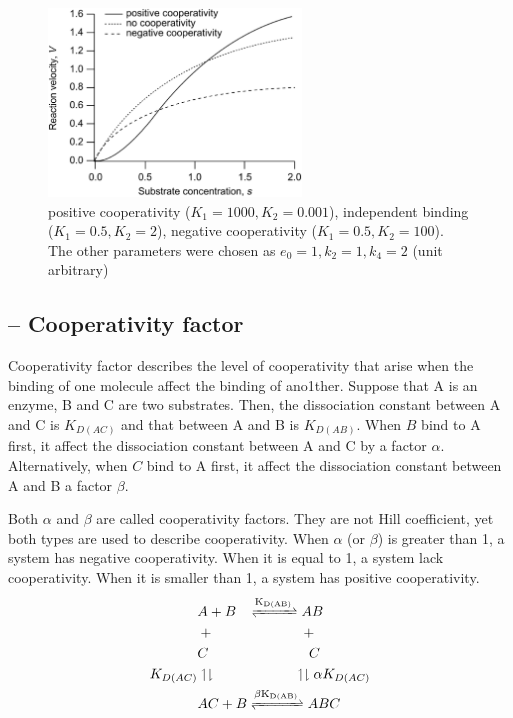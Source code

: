 \begin{figure}[hbt]
  \centerline{\includegraphics[height=5cm,
    angle=0]{./images/cooperativity.eps}}
  \caption{positive cooperativity ($K_1=1000, K_2=0.001$), independent
    binding ($K_1=0.5,K_2=2$), negative cooperativity
    ($K_1=0.5,K_2=100$). The other parameters were chosen as
    $e_0=1,k_2=1,k_4=2$ (unit arbitrary)}
\label{fig:cooperativity}
\end{figure}

\subsection{-- Cooperativity factor}
\label{sec:coop-fact}

Cooperativity factor describes the level of cooperativity that arise
when the binding of one molecule affect the binding of
ano1ther. Suppose that A is an enzyme, B and C are two
substrates. Then, the dissociation constant between A and C is
$K_{D(AC)}$ and that between A and B is $K_{D(AB)}$. When $B$ bind to
A first, it affect the dissociation constant between A and C by a
factor $\alpha$. Alternatively, when $C$ bind to A first, it affect
the dissociation constant between A and B a factor $\beta$. 

Both $\alpha$ and $\beta$ are called cooperativity factors. They are
not Hill coefficient, yet both types are used to describe
cooperativity. When $\alpha$ (or $\beta$) is greater than 1, a system
has negative cooperativity. When it is equal to 1, a system lack
cooperativity. When it is smaller than 1, a system has positive
cooperativity. 
\begin{equation}
  \label{eq:342}
  \begin{split}
    &A + B \;\;\; \ce{<=>[K_{D(AB)}]} AB \\
    &+ \;\;\;\;\;\;\;\;\;\;\;\;\;\;\;\;\;\;\;\;\;\;\;  + \\
    &C\;\;\;\;\;\;\;\;\;\;\;\;\;\;\;\;\;\;\;\;\;\;\;\;\;\;  C \\
    K_{D(AC)}&\upharpoonleft\downharpoonright  \;\;\;\;\;\;\;\;\;\;\;\;\;\;\;\;\;\;\;\;\;\;    \upharpoonleft\downharpoonright\alpha K_{D(AC)} \\
    &AC + B \ce{<=>[\beta K_{D(AB)}]} ABC
  \end{split}
\end{equation}

